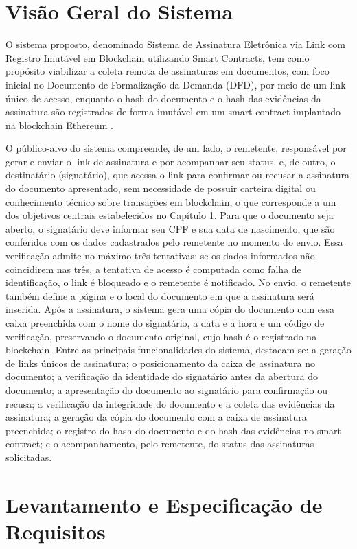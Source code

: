 \documentclass[
    12pt,
    a4paper,
    oneside,
    chapter=TITLE,
    section=TITLE,
    subsection=TITLE,
    subsubsection=TITLE,
    sumario=tradicional,
    english,
    brazil
]{abntex2}
\begin{document}
\section{Visão Geral do Sistema}
\label{sec:visao-geral}

O sistema proposto, denominado Sistema de Assinatura Eletrônica via Link
com Registro Imutável em Blockchain utilizando Smart Contracts, tem
como propósito viabilizar a coleta remota de assinaturas em
documentos, com foco inicial no Documento de Formalização da
Demanda (DFD), por meio de um link único de acesso, enquanto o
hash do documento e o hash das evidências da assinatura são
registrados de forma imutável em um smart contract implantado na blockchain Ethereum
\cite{buterin2014}.

O público-alvo do sistema compreende, de um lado, o remetente,
responsável por gerar e enviar o link de assinatura e por acompanhar
seu status, e, de outro, o destinatário (signatário), que acessa o
link para confirmar ou recusar a assinatura do documento apresentado, sem
necessidade de possuir carteira digital ou conhecimento técnico sobre
transações em blockchain, o que corresponde a um dos objetivos
centrais estabelecidos no Capítulo 1. Para que o documento seja aberto,
o signatário deve informar seu CPF e sua data de nascimento, que são
conferidos com os dados cadastrados pelo remetente no momento do envio.
Essa verificação admite no máximo três tentativas: se os dados
informados não coincidirem nas três, a tentativa de acesso é computada
como falha de identificação, o link é bloqueado e o remetente é
notificado. No envio, o remetente também define a página e o local do
documento em que a assinatura será inserida. Após a assinatura, o
sistema gera uma cópia do documento com essa caixa preenchida com o
nome do signatário, a data e a hora e um código de verificação,
preservando o documento original, cujo hash é o registrado na
blockchain. Entre as principais funcionalidades do
sistema, destacam-se: a geração de links únicos de assinatura; o
posicionamento da caixa de assinatura no documento; a
verificação da identidade do signatário antes da abertura do documento; a
apresentação do documento ao signatário para confirmação ou recusa; a
verificação da integridade do documento e a coleta das evidências da
assinatura; a geração da cópia do documento com a caixa de assinatura
preenchida; o registro do hash do documento e do hash das evidências
no smart contract; e o
acompanhamento, pelo remetente, do status das assinaturas
solicitadas.

\section{Levantamento e Especificação de Requisitos}
\label{sec:requisitos}
\end{document}
